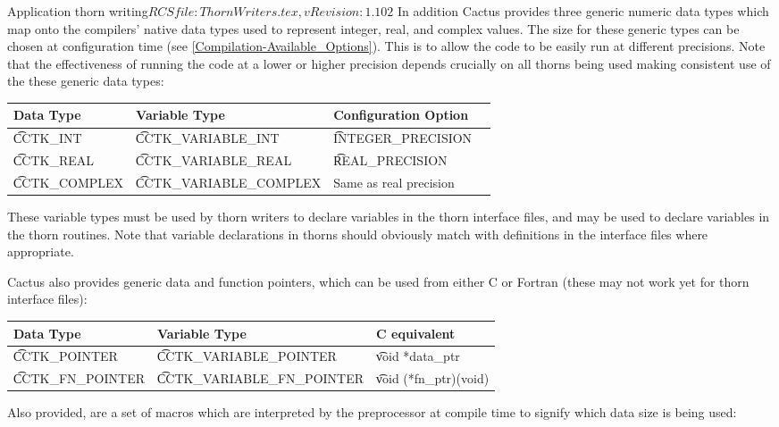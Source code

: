 \begin{cactuspart}{2}{Application thorn writing}{$RCSfile: ThornWriters.tex,v $}{$Revision: 1.102 $}
In addition Cactus provides three generic numeric data types which map onto
the compilers' native data types used to represent integer, real, and complex
values. The size for these generic types can be chosen at configuration time
(see \ref{Compilation-Available_Options}). This is to allow the code to be
easily run at different precisions. Note that the effectiveness of running the
code at a lower or higher precision depends crucially on all thorns being used
making consistent use of the these generic data types:

\begin{center}
\begin{tabular}{|l|l|l|l|}
\hline
Data Type          & Variable Type & Configuration Option\\
\hline
{\t CCTK\_INT}     & {\t CCTK\_VARIABLE\_INT} & {\t INTEGER\_PRECISION}\\
{\t CCTK\_REAL}    & {\t CCTK\_VARIABLE\_REAL} & {\t REAL\_PRECISION}\\
{\t CCTK\_COMPLEX} & {\t CCTK\_VARIABLE\_COMPLEX} & Same as real precision\\
\hline
\end{tabular}
\end{center}


These variable types must be used by thorn writers to declare variables
 in the thorn interface files, and may be used to declare
variables in the thorn routines. Note that variable declarations in
thorns should obviously match with definitions in the interface files
where appropriate.

Cactus also provides generic data and function pointers, which can
be used from either C or Fortran (these may not work yet for thorn interface
files):

\begin{center}
\begin{tabular}{|l|l|l|}
\hline
Data Type          	& Variable Type & C equivalent			\\
\hline
{\t CCTK\_POINTER}	& {\t CCTK\_VARIABLE\_POINTER}
					& {\t void *data\_ptr}		\\
{\t CCTK\_FN\_POINTER}	& {\t CCTK\_VARIABLE\_FN\_POINTER}
					& {\t void (*fn\_ptr)(void)}	\\
\hline
\end{tabular}
\end{center}

Also provided, are a set of macros which
are interpreted by the preprocessor at compile time to signify which
data size is being used:


\end{cactuspart}
